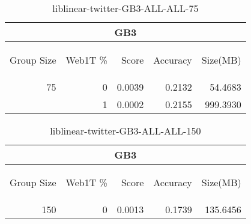 \begin{center}
\begin{table}[htbp] 
 \begin{center}
\begin{tabular}{ | r | r | r | r | r |}
\hline
\multicolumn{5}{|c|}{GB3}\\
\hline
\begin{sideways}Group Size\end{sideways} & \begin{sideways}Web1T \%\end{sideways} & \begin{sideways}Score\end{sideways} & \begin{sideways}Accuracy\end{sideways} & \begin{sideways}Size(MB)\end{sideways}\\
\hline
\multirow{1}{*}{75}
 & 0 & 0.0039 & 0.2132 & 54.4683\\ \cline{2-5}
 & 1 & 0.0002 & 0.2155 & 999.3930\\ \cline{2-5}
\hline
\end{tabular}
\caption{liblinear-twitter-GB3-ALL-ALL-75}
\label{table:liblinear-twitter-GB3-ALL-ALL-75}
\end{center}
 \end{table}
\end{center}

\begin{center}
\begin{table}[htbp] 
 \begin{center}
\begin{tabular}{ | r | r | r | r | r |}
\hline
\multicolumn{5}{|c|}{GB3}\\
\hline
\begin{sideways}Group Size\end{sideways} & \begin{sideways}Web1T \%\end{sideways} & \begin{sideways}Score\end{sideways} & \begin{sideways}Accuracy\end{sideways} & \begin{sideways}Size(MB)\end{sideways}\\
\hline
\multirow{0}{*}{150}
 & 0 & 0.0013 & 0.1739 & 135.6456\\ \cline{2-5}
\hline
\end{tabular}
\caption{liblinear-twitter-GB3-ALL-ALL-150}
\label{table:liblinear-twitter-GB3-ALL-ALL-150}
\end{center}
 \end{table}
\end{center}

